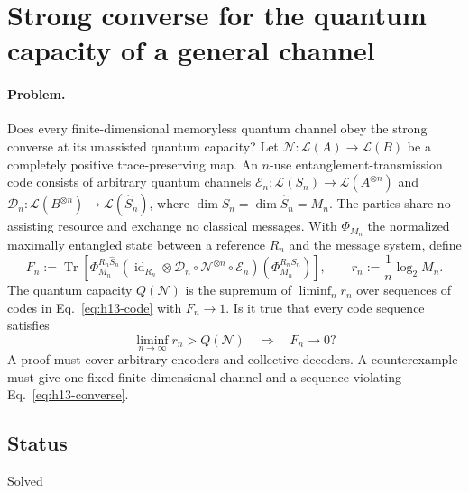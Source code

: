 \section{Strong converse for the quantum capacity of a general channel}
\label{sec:op_38f9dbb6c3f92b0c}

\paragraph{Problem.}
Does every finite-dimensional memoryless quantum channel obey the strong converse at its unassisted quantum capacity? Let $\mathcal N:\mathcal L(A)\to\mathcal L(B)$ be a completely positive trace-preserving map. An $n$-use entanglement-transmission code consists of arbitrary quantum channels $\mathcal E_n:\mathcal L(S_n)\to\mathcal L(A^{\otimes n})$ and $\mathcal D_n:\mathcal L(B^{\otimes n})\to\mathcal L(\widehat S_n)$, where $\dim S_n=\dim\widehat S_n=M_n$. The parties share no assisting resource and exchange no classical messages. With $\Phi_{M_n}$ the normalized maximally entangled state between a reference $R_n$ and the message system, define
\begin{equation}
 F_n:=\operatorname{Tr}\!\left[\Phi_{M_n}^{R_n\widehat S_n}(\operatorname{id}_{R_n}\otimes\mathcal D_n\circ\mathcal N^{\otimes n}\circ\mathcal E_n)(\Phi_{M_n}^{R_n S_n})\right],\qquad r_n:=\frac1n\log_2 M_n.
 \label{eq:h13-code}
\end{equation}
The quantum capacity $Q(\mathcal N)$ is the supremum of $\liminf_n r_n$ over sequences of codes in Eq.~\eqref{eq:h13-code} with $F_n\to1$. Is it true that every code sequence satisfies
\begin{equation}
 \liminf_{n\to\infty}r_n>Q(\mathcal N)\quad\Longrightarrow\quad F_n\longrightarrow0?
 \label{eq:h13-converse}
\end{equation}
A proof must cover arbitrary encoders and collective decoders. A counterexample must give one fixed finite-dimensional channel and a sequence violating Eq.~\eqref{eq:h13-converse}.

\subsection*{Status}

Solved

